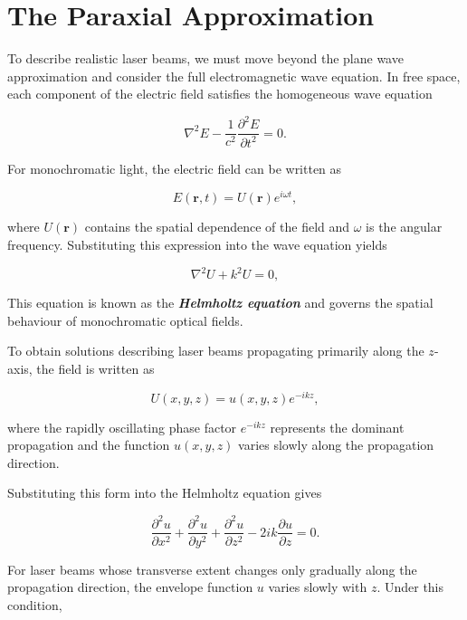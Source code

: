 \documentclass{report}
\begin{document}
\section{The Paraxial Approximation}

To describe realistic laser beams, we must move beyond the plane wave approximation and consider the full electromagnetic wave equation. In free space, each component of the electric field satisfies the homogeneous wave equation

\begin{equation}
\nabla^2 E - \frac{1}{c^2}\frac{\partial^2 E}{\partial t^2}=0.
\end{equation}

For monochromatic light, the electric field can be written as

\begin{equation}
E(\mathbf{r},t)=U(\mathbf{r})e^{i\omega t},
\end{equation}

where $U(\mathbf{r})$ contains the spatial dependence of the field and $\omega$ is the angular frequency. Substituting this expression into the wave equation yields

\begin{equation}
\nabla^2 U + k^2 U = 0,
\end{equation}

This equation is known as the \textit{\textbf{Helmholtz equation}} and governs the spatial behaviour of monochromatic optical fields.

To obtain solutions describing laser beams propagating primarily along the $z$-axis, the field is written as

\begin{equation}
U(x,y,z)=u(x,y,z)e^{-ikz},
\end{equation}

where the rapidly oscillating phase factor $e^{-ikz}$ represents the dominant propagation and the function $u(x,y,z)$ varies slowly along the propagation direction.

Substituting this form into the Helmholtz equation gives

\begin{equation}
\frac{\partial^2 u}{\partial x^2}
+
\frac{\partial^2 u}{\partial y^2}
+
\frac{\partial^2 u}{\partial z^2}
-
2ik\frac{\partial u}{\partial z}
=
0.
\end{equation}

For laser beams whose transverse extent changes only gradually along the propagation direction, the envelope function $u$ varies slowly with $z$. Under this condition,
\end{document}
